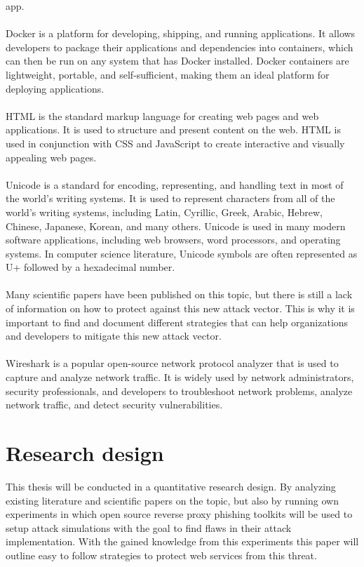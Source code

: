 \documentclass[12pt]{report}
\begin{document}
app. \\ \\
Docker is a platform for developing, shipping, and running applications. It allows
developers to package their applications and dependencies into containers, which
can then be run on any system that has Docker installed. Docker containers are
lightweight, portable, and self-sufficient, making them an ideal platform for
deploying applications. \\ \\
HTML is the standard markup language for creating web pages and web applications.
It is used to structure and present content on the web. HTML is used in conjunction
with CSS and JavaScript to create interactive and visually appealing web pages.
\\ \\
Unicode is a standard for encoding, representing, and handling text in most of the
world's writing systems. It is used to represent characters from all of the world's
writing systems, including Latin, Cyrillic, Greek, Arabic, Hebrew, Chinese, Japanese,
Korean, and many others. Unicode is used in many modern software applications,
including web browsers, word processors, and operating systems. In computer science
literature, Unicode symbols are often represented as U+ followed by a hexadecimal number. \\ \\
Many scientific papers have been published on this topic, but there is still a
lack of information on how to protect against this new attack vector. This is why
it is important to find and document different strategies that can help organizations
and developers to mitigate this new attack vector. \\ \\
Wireshark is a popular open-source network protocol analyzer that is used to capture and
analyze network traffic. It is widely used by network administrators, security
professionals, and developers to troubleshoot network problems, analyze network
traffic, and detect security vulnerabilities.

\section{Research design}
This thesis will be conducted in a quantitative research design. By analyzing
existing literature and scientific papers on the topic, but also by running own
experiments in which open source reverse proxy phishing toolkits will be used to
setup attack simulations with the goal to find flaws in their attack implementation.
With the gained knowledge from this experiments this paper will outline easy
to follow strategies to protect web services from this threat.
\end{document}
